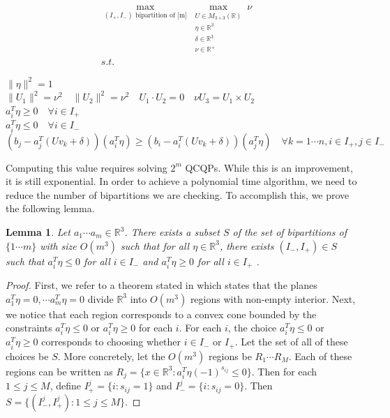 \documentclass[a4paper]{amsart}
\newtheorem{lem}[thm]{Lemma}
\theoremstyle{remark}
\begin{document}
\begin{gather*}
	\max_{(I_+,I_-)\textrm{ bipartition of [m]}}
	\max_{\begin{matrix}U \in M_{3 \times 3}(\mathbb{R}) \\ \eta \in \mathbb{R}^3 \\ \delta \in \mathbb{R}^3 \\ \nu \in \mathbb{R}^+ \end{matrix}}
	\nu \quad\\
	s.t.
\end{gather*}
\begin{center}
	$\lVert \eta \rVert^2 = 1$\\
	$\lVert U_1 \rVert^2 = \nu^2 \quad \lVert U_2 \rVert^2 = \nu^2 \quad U_1 \cdot U_2 = 0 \quad \nu U_3 = U_1 \times U_2$\\
	$a_i^T\eta \geq 0 \quad \forall i \in I_+$\\
	$a_i^T\eta \leq 0 \quad \forall i \in I_-$\\
	$(b_j-a_j^T(U v_k+\delta))(a_i^T\eta) \geq (b_i-a_i^T(U v_k+\delta))(a_j^T\eta) \quad \forall k =1 \cdots n, i \in I_+, j \in I_-$
\end{center}
\noindent
Computing this value requires solving $2^m$ QCQPs. While this is an improvement, it is still exponential. In order to achieve a polynomial time algorithm, we need to reduce the number of bipartitions we are checking. To accomplish this, we prove the following lemma.
\begin{lem} \label{lem:hyperplanes}
	Let $a_1 \cdots a_m \in \mathbb{R}^3$. There exists a subset $S$ of the set of bipartitions of $\{1 \cdots m\}$ with size $O(m^3)$ such that for all $\eta \in \mathbb{R}^3$, there exists $(I_-, I_+) \in S$ such that $a_i^T \eta \leq 0$ for all $i \in I_-$ and $a_i^T\eta \geq 0$ for all $i \in I_+$ .
\end{lem}
\begin{proof}
	First, we refer to a theorem stated in \cite{Ra20} which states that the planes $a_1^T\eta = 0, \cdots a_m^T \eta = 0$ divide $\mathbb{R}^3$ into $O(m^3)$ regions with non-empty interior. Next, we notice that each region corresponds to a convex cone bounded by the constraints $a_i^T \eta \leq 0$ or $a_i^T\eta \geq 0$ for each $i$. For each $i$, the choice $a_i^T \eta \leq 0$ or $a_i^T \eta \geq 0$ corresponds to choosing whether $i \in I_-$ or $I_+$. Let the set of all of these choices be $S$. More concretely, let the $O(m^3)$ regions be $R_1 \cdots R_M$. Each of these regions can be written as $R_j = \{x \in \mathbb{R}^3: a_i^T\eta (-1)^{s_{ij}} \leq 0\}$. Then for each $1 \leq j \leq M$, define $I_+^j = \{i:s_{ij} = 1\}$ and $I_-^j = \{i:s_{ij} = 0\}$. Then $S = \{(I_-^j, I_+^j):1 \leq j \leq M\}$.
\end{proof}
\end{document}
